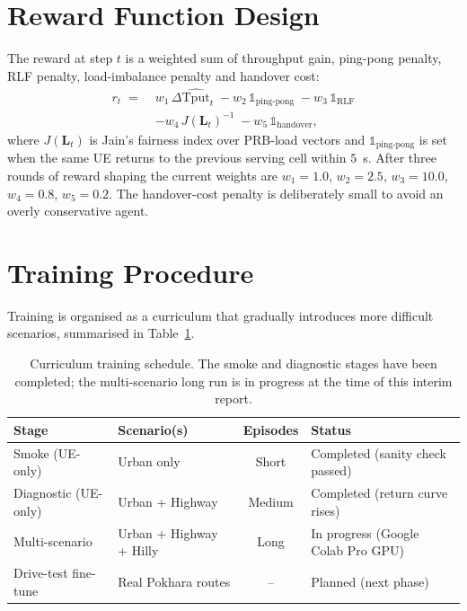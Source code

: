\documentclass[12pt,a4paper,oneside]{report}
\begin{document}
\section{Reward Function Design}

The reward at step $t$ is a weighted sum of throughput gain, ping-pong
penalty, RLF penalty, load-imbalance penalty and handover cost:
\begin{equation}
\begin{aligned}
r_t \;=\;& w_{1}\,\Delta\widehat{\text{Tput}}_t \;
        - w_{2}\,\mathbb{1}_{\text{ping-pong}} \;
        - w_{3}\,\mathbb{1}_{\text{RLF}}\\
        &- w_{4}\,J(\mathbf{L}_t)^{-1} \;
        - w_{5}\,\mathbb{1}_{\text{handover}},
\end{aligned}
\end{equation}
where $J(\mathbf{L}_t)$ is Jain's fairness index over PRB-load vectors
and $\mathbb{1}_{\text{ping-pong}}$ is set when the same UE returns to
the previous serving cell within $5$~s. After three rounds of reward
shaping the current weights are $w_1=1.0$, $w_2=2.5$, $w_3=10.0$,
$w_4=0.8$, $w_5=0.2$. The handover-cost penalty is deliberately small
to avoid an overly conservative agent.

\section{Training Procedure}

Training is organised as a curriculum that gradually introduces more
difficult scenarios, summarised in Table~\ref{tab:curriculum}.

\begin{table}[H]
    \centering
    \caption{Curriculum training schedule. The smoke and diagnostic
    stages have been completed; the multi-scenario long run is in
    progress at the time of this interim report.}
    \label{tab:curriculum}
    \small
    \begin{tabularx}{\textwidth}{llcl}
        \toprule
        \textbf{Stage} & \textbf{Scenario(s)} & \textbf{Episodes} &
        \textbf{Status}\\
        \midrule
        Smoke (UE-only)         & Urban only        &  Short
        & Completed (sanity check passed)\\
        Diagnostic (UE-only)    & Urban + Highway   & Medium
        & Completed (return curve rises)\\
        Multi-scenario          & Urban + Highway + Hilly & Long
        & In progress (Google Colab Pro GPU)\\
        Drive-test fine-tune    & Real Pokhara routes & --
        & Planned (next phase)\\
        \bottomrule
    \end{tabularx}
\end{table}
\end{document}
